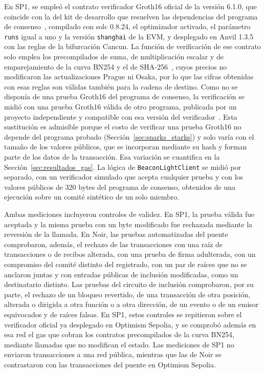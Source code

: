 En SP1, se empleó el contrato verificador Groth16 oficial de la versión 6.1.0, que coincide con la
del kit de desarrollo que resuelven las dependencias del programa de consenso~\cite{sp1contracts}, compilado con solc 0.8.24, el optimizador
activado, el parámetro \texttt{runs} igual a uno y la versión \texttt{shanghai} de la EVM, y
desplegado en Anvil 1.3.5~\cite{anvildocs} con las reglas de la bifurcación Cancun. La función
de verificación de ese contrato solo emplea los precompilados de suma, de multiplicación escalar y
de emparejamiento de la curva BN254 y el de SHA-256~\cite{sp1contracts}, cuyos precios no
modificaron las actualizaciones Prague ni Osaka, por lo que las cifras obtenidas con esas reglas
son válidas también para la cadena de destino. Como no se disponía de una prueba Groth16 del programa
de consenso, la verificación se midió con una prueba Groth16 válida de otro programa, publicada por
un proyecto independiente y compatible con esa versión del verificador~\cite{zekofixture}. Esta
sustitución es admisible porque el costo de verificar una prueba Groth16 no depende del programa
probado (Sección~\ref{sec:snarks_starks}) y solo varía con el tamaño de los valores públicos, que
se incorporan mediante su hash y forman parte de los datos de la transacción. Esa variación se
cuantifica en la Sección~\ref{sec:resultados_gas}. La lógica de \texttt{BeaconLightClient} se
midió por separado, con un verificador simulado que acepta cualquier prueba y con los valores
públicos de 320 bytes del programa de consenso, obtenidos de una ejecución sobre un comité
sintético de un solo miembro.

Ambas mediciones incluyeron controles de validez. En SP1, la prueba válida fue aceptada y la misma
prueba con un byte modificado fue rechazada mediante la reversión de la llamada. En Noir, las
pruebas automatizadas del puente comprobaron, además, el rechazo de las transacciones con una
raíz de transacciones o de recibos alterada, con una prueba de firma adulterada, con un compromiso
del comité distinto del registrado, con un par de raíces que no se anclaron juntas y con entradas
públicas de inclusión modificadas, como un destinatario distinto. Las pruebas del circuito de
inclusión comprobaron, por su parte, el rechazo de un bloqueo revertido, de una transacción de
otra posición, alterada o dirigida a otra función o a otra dirección, de un evento o de un emisor
equivocados y de raíces falsas. En SP1, estos controles se
repitieron sobre el verificador oficial ya desplegado en Optimism Sepolia, y se comprobó además en
esa red el gas que cobran los contratos precompilados de la curva BN254, mediante llamadas que no
modifican el estado. Las mediciones de SP1 no enviaron transacciones a una red pública, mientras
que las de Noir se contrastaron con las transacciones del puente en Optimism Sepolia.

